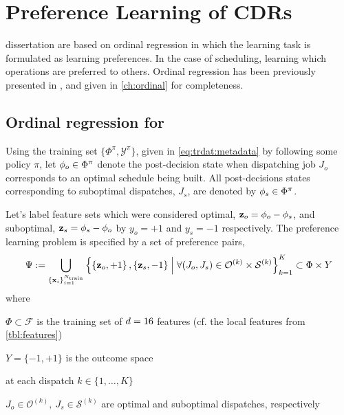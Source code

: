 
\chapter{Preference Learning of CDRs}\label{ch:prefmodels} 
 dissertation are based on ordinal regression in which the learning task is formulated as learning preferences. In the case of scheduling, learning which operations are preferred to others. Ordinal regression has been previously presented in \cite{Ru06:PPSN}, and given in \cref{ch:ordinal} for completeness. 

\section{Ordinal regression for \jsp}
Using the training set $\{\Phi^\pi,\mathcal{Y}^\pi\}$, given in 
\cref{eq:trdat:metadata} by following some policy $\pi$, 
let ${\mathbf{\phi}}_{o}\in\Phi^\pi$ denote the post-decision state when dispatching 
job $J_o$ corresponds to an optimal schedule being built. All post-decisions 
states corresponding to suboptimal dispatches, $J_s$, are denoted by 
${\mathbf{\phi}}_{s}\in\Phi^\pi$. 

Let's label feature sets which were considered optimal, 
$\mathbf{z}_{o}={\mathbf{\phi}}_{o}-{\mathbf{\phi}}_{s}$, and suboptimal, 
$\mathbf{z}_{s}={\mathbf{\phi}}_{s}-{\mathbf{\phi}}_{o}$ by $y_o=+1$ and $y_s=-1$ respectively. 
The preference learning problem is specified by a set of preference pairs,
\begin{equation}\label{eq:Psi:jsp}
	\Psi := \bigcup_{\{\vec{x}_i\}_{i=1}^{N_{\text{train}}}}
    \condset{
        \left\{\vec{z}_o,+1\right\},\left\{\vec{z}_s,-1\right\}}{\forall 
        (J_o,J_s) 
        \in \mathcal{O}^{(k)} \times \mathcal{S}^{(k)}}_{k=1}^K 
    \subset \Phi\times Y 
\end{equation}
where 
\begin{enumerate*}
  \item $\Phi\subset\mathcal{F}$ is the training set of $d=16$ 
  features (cf. the local features from \cref{tbl:features}) 
  \item $Y=\{-1,+1\}$ is the outcome space
  \item at each dispatch $k\in\{1,\ldots,K\}$
  \item $J_o\in\mathcal{O}^{(k)},~J_s\in \mathcal{S}^{(k)}$
  are optimal and suboptimal dispatches, respectively
\end{enumerate*}

